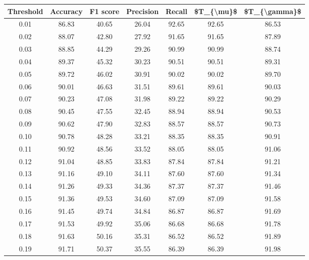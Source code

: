 \begin{tabular}{|c|c|c|c|c|c|c|}
\hline
 Threshold &  Accuracy &  F1 score &  Precision &  Recall &  \$T\_\{\textbackslash mu\}\$ &  \$T\_\{\textbackslash gamma\}\$ \\
\hline
      0.01 &     86.83 &     40.65 &      26.04 &   92.65 &      92.65 &         86.53 \\
      0.02 &     88.07 &     42.80 &      27.92 &   91.65 &      91.65 &         87.89 \\
      0.03 &     88.85 &     44.29 &      29.26 &   90.99 &      90.99 &         88.74 \\
      0.04 &     89.37 &     45.32 &      30.23 &   90.51 &      90.51 &         89.31 \\
      0.05 &     89.72 &     46.02 &      30.91 &   90.02 &      90.02 &         89.70 \\
      0.06 &     90.01 &     46.63 &      31.51 &   89.61 &      89.61 &         90.03 \\
      0.07 &     90.23 &     47.08 &      31.98 &   89.22 &      89.22 &         90.29 \\
      0.08 &     90.45 &     47.55 &      32.45 &   88.94 &      88.94 &         90.53 \\
      0.09 &     90.62 &     47.90 &      32.83 &   88.57 &      88.57 &         90.73 \\
      0.10 &     90.78 &     48.28 &      33.21 &   88.35 &      88.35 &         90.91 \\
      0.11 &     90.92 &     48.56 &      33.52 &   88.05 &      88.05 &         91.06 \\
      0.12 &     91.04 &     48.85 &      33.83 &   87.84 &      87.84 &         91.21 \\
      0.13 &     91.16 &     49.10 &      34.11 &   87.60 &      87.60 &         91.34 \\
      0.14 &     91.26 &     49.33 &      34.36 &   87.37 &      87.37 &         91.46 \\
      0.15 &     91.36 &     49.53 &      34.60 &   87.09 &      87.09 &         91.58 \\
      0.16 &     91.45 &     49.74 &      34.84 &   86.87 &      86.87 &         91.69 \\
      0.17 &     91.53 &     49.92 &      35.06 &   86.68 &      86.68 &         91.78 \\
      0.18 &     91.63 &     50.16 &      35.31 &   86.52 &      86.52 &         91.89 \\
      0.19 &     91.71 &     50.37 &      35.55 &   86.39 &      86.39 &         91.98 \\

\end{tabular}

